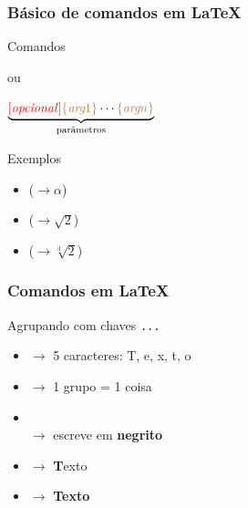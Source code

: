 \begin{frame}
\frametitle{Básico de comandos em \LaTeX}


  \begin{block}{Comandos}

    \texttt{}\smallskip

    ou\smallskip

    \texttt{$\underbrace{\text{\red{[\textit{opcional}]}\brown{\ac\textit{arg$1$}\fc}}
        \cdots \text{\brown{\ac \textit{arg$n$}\fc}}}_{\text{parâmetros}}$}

  \end{block}

Exemplos

\begin{itemize}
\item \texttt{\purple{\string\alpha}} \quad ($\to\alpha$)
\item \texttt{\brown{\ac{}2\fc}} \quad
  ($\to\sqrt{2}$)
\item \texttt{\red{[3]}\brown{\ac{}2\fc}} \quad
  ($\to\sqrt[3]{2}$)
\end{itemize}

\end{frame}


\begin{frame}
\frametitle{Comandos em \LaTeX}

  \begin{block}{Agrupando com chaves \texttt{\ac{}...\fc{}}}

    \begin{itemize}\smallskip
    \item {} $\to$ 5 caracteres: T, e, x, t, o\smallskip
    \item {} $\to$ 1 grupo = 1 coisa
    \end{itemize}

  \end{block}


  \begin{exemplo}

    \begin{itemize}\smallskip
      \item  \purple{\texttt{\string\textbf}} \\
      $\to$ escreve  em \textbf{negrito}\\
      \qquad {}\bigskip


    \item {} $\to$ \textbf Texto
      \quad {}\smallskip
    \item {} $\to$
      \textbf{Texto} \quad {}
      \smallskip
    \end{itemize}

  \end{exemplo}
\end{frame}



